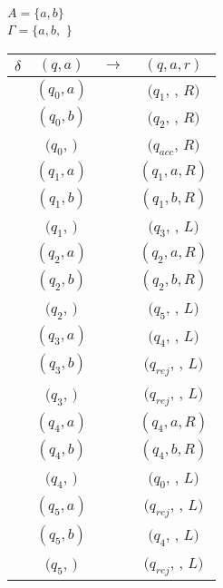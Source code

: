 \documentclass[12pt, a4paper]{article}
\begin{document}
\(A = \{a,b\}\)\\
\(\Gamma = \{a,b,\) \textvisiblespace\(\}\)\\
\begin{tabular}{c c c c}
    \(\delta\) & \((q, a)\) & \(\rightarrow\) & \((q, a, r)\)\\
    \hline
            &\((q_0, a)\)                       && \((q_1\), \textvisiblespace, \(R)\)\\
            &\((q_0, b)\)                       && \((q_2\), \textvisiblespace, \(R)\)\\
            &\((q_0\), \textvisiblespace\()\)   && \((q_{acc}\)\textvisiblespace, \(R)\)\\
            &\((q_1, a)\)                       && \((q_1, a, R)\)\\
            &\((q_1, b)\)                       && \((q_1, b, R)\)\\
            &\((q_1\), \textvisiblespace \()\)  && \((q_3\), \textvisiblespace, \(L)\)\\
            &\((q_2, a)\)                       && \((q_2, a, R)\)\\
            &\((q_2, b)\)                       && \((q_2, b, R)\)\\
            &\((q_2\), \textvisiblespace \()\)  && \((q_5\), \textvisiblespace, \(L)\)\\
            &\((q_3, a)\)                       && \((q_4\), \textvisiblespace, \(L)\)\\
            &\((q_3, b)\)                       && \((q_{rej}\), \textvisiblespace, \(L)\)\\
            &\((q_3\), \textvisiblespace \()\)  && \((q_{rej}\), \textvisiblespace, \(L)\)\\
            &\((q_4, a)\)                       && \((q_4, a, R)\)\\
            &\((q_4, b)\)                       && \((q_4, b, R)\)\\
            &\((q_4\), \textvisiblespace \()\)  && \((q_0\), \textvisiblespace, \(L)\)\\
            &\((q_5, a)\)                       && \((q_{rej}\), \textvisiblespace, \(L)\)\\
            &\((q_5, b)\)                       && \((q_4\), \textvisiblespace, \(L)\)\\
            &\((q_5\), \textvisiblespace \()\)  && \((q_{rej}\), \textvisiblespace, \(L)\)\\
\end{tabular}
\end{document}
